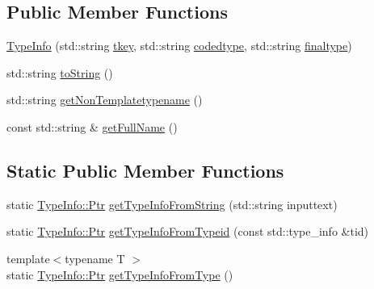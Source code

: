 \subsection*{Public Member Functions}
\begin{DoxyCompactItemize}
\item 
\hyperlink{classsmacc_1_1introspection_1_1TypeInfo_ae57986b3f7e913346a379ec7ad609ffc}{Type\+Info} (std\+::string \hyperlink{classsmacc_1_1introspection_1_1TypeInfo_a697dd505119258dba1224d10eea5b2bd}{tkey}, std\+::string \hyperlink{classsmacc_1_1introspection_1_1TypeInfo_a117d2b73994b78a6e4e81cdf7054912c}{codedtype}, std\+::string \hyperlink{classsmacc_1_1introspection_1_1TypeInfo_aa4010ed427e12db443e08ab16a3de243}{finaltype})
\item 
std\+::string \hyperlink{classsmacc_1_1introspection_1_1TypeInfo_a41eb6c64f46a8e24a206e5702c6f6818}{to\+String} ()
\item 
std\+::string \hyperlink{classsmacc_1_1introspection_1_1TypeInfo_aa431c3dbe04a695a5e213620062c8719}{get\+Non\+Templatetypename} ()
\item 
const std\+::string \& \hyperlink{classsmacc_1_1introspection_1_1TypeInfo_ad00815e2537a11be93c9a80846f4dc3a}{get\+Full\+Name} ()
\end{DoxyCompactItemize}
\subsection*{Static Public Member Functions}
\begin{DoxyCompactItemize}
\item 
static \hyperlink{classsmacc_1_1introspection_1_1TypeInfo_aa6ffd9c39811d59f7c771941b7fad860}{Type\+Info\+::\+Ptr} \hyperlink{classsmacc_1_1introspection_1_1TypeInfo_a47d65b6c61499d7ae8ab9f6325c84837}{get\+Type\+Info\+From\+String} (std\+::string inputtext)
\item 
static \hyperlink{classsmacc_1_1introspection_1_1TypeInfo_aa6ffd9c39811d59f7c771941b7fad860}{Type\+Info\+::\+Ptr} \hyperlink{classsmacc_1_1introspection_1_1TypeInfo_a09ec2f3f94a8f1fc82ae250216c38d47}{get\+Type\+Info\+From\+Typeid} (const std\+::type\+\_\+info \&tid)
\item 
{\footnotesize template$<$typename T $>$ }\\static \hyperlink{classsmacc_1_1introspection_1_1TypeInfo_aa6ffd9c39811d59f7c771941b7fad860}{Type\+Info\+::\+Ptr} \hyperlink{classsmacc_1_1introspection_1_1TypeInfo_a8716ca6ac890b4582986d9fe4f5962ad}{get\+Type\+Info\+From\+Type} ()
\end{DoxyCompactItemize}
